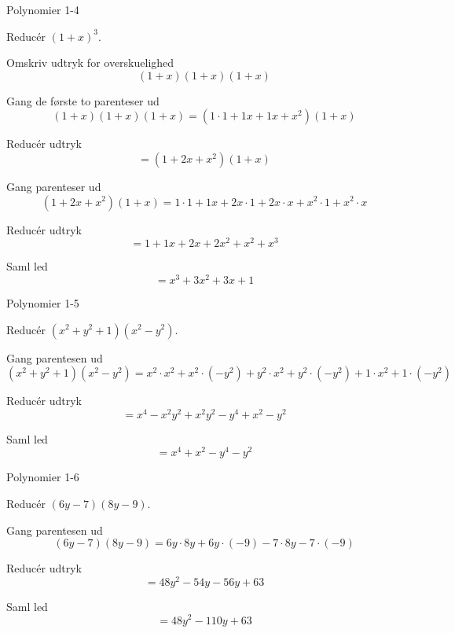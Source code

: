 \documentclass{article}
\begin{document}
\newpage

\begin{exercise}{Polynomier 1-4}

Reducér $(1 + x)^3$.


\hint

Omskriv udtryk for overskuelighed
\[
(1 + x)(1 + x)(1 + x)
\]

\hint

Gang de første to parenteser ud
\[
(1 + x)(1 + x)(1 + x) = (1 \cdot 1 +1x +1x + x^2)(1 + x)
\]

\hint

Reducér udtryk
\[
= (1 + 2x + x^2)(1 + x)
\]

\hint

Gang parenteser ud
\[
(1 + 2x + x^2)(1 + x) = 1 \cdot 1 + 1x +2x \cdot 1 + 2x \cdot x + x^2 \cdot 1 + x^2 \cdot x
\]
\hint

Reducér udtryk
\[
= 1 + 1x + 2x + 2x^2 + x^2 +x^3
\]


\hint

Saml led
\[
= x^3 + 3x^2 + 3x +1
\]

\end{exercise}

\newpage

\begin{exercise}{Polynomier 1-5}

Reducér $(x^2 + y^2 + 1)(x^2 - y^2)$.


\hint

Gang parentesen ud
\[
(x^2 + y^2 + 1)(x^2 - y^2) = x^2 \cdot x^2 + x^2 \cdot (-y^2) + y^2 \cdot x^2 + y^2 \cdot (-y^2) + 1 \cdot x^2 + 1 \cdot (-y^2)
\]

\hint

Reducér udtryk
\[
 = x^4 -x^2 y^2 + x^2y^2 -y^4 + x^2 - y^2
\]


\hint

Saml led
\[
= x^4 +x^2 - y^4 - y^2
\]

\end{exercise}

\newpage

\begin{exercise}{Polynomier 1-6}

Reducér $(6y - 7)(8y - 9)$.


\hint

Gang parentesen ud
\[
(6y - 7)(8y - 9) = 6y \cdot 8y + 6y \cdot (-9) -7 \cdot 8y - 7 \cdot (-9)
\]

\hint

Reducér udtryk
\[
= 48y^2 - 54y - 56y + 63
\]


\hint

Saml led
\[
= 48y^2 - 110y + 63
\]

\end{exercise}
\end{document}
